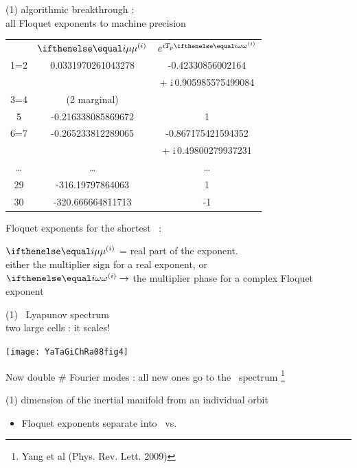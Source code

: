 \begin{frame}{(1) algorithmic breakthrough : \\
            all Floquet exponents to machine precision}
\begin{center}
\small
\begin{tabular}{  c | c | c| } %

	&  \large{$\eigRe[i]$ }  &\large{$e^{iT_{p}\eigIm[i]}$}   \\
  1=2  & 0.0331970261043278   & -0.42330856002164    \\
	& 			  & + i\,0.905985575499084 \\
  3=4  & (2 marginal) &                          \\
	5  & -0.216338085869672   & 1                         \\
  6=7  & -0.265233812289065   & -0.867175421594352   \\
	& 			  & + i\,0.49800279937231   \\
	\dots & \dots  & \dots                   \\
	29 & -316.19797864063     & 1                         \\
	30 & -320.666664811713    & -1                        \\
	\end{tabular}
	\end{center}
\bigskip

Floquet exponents for the shortest \ppo\ :

\bigskip

$\eigRe[i]$ = real part of the exponent.
\\
either
the multiplier sign for a real exponent, or
\\
$\eigIm[i] \to $
the multiplier phase for a complex Floquet exponent
\end{frame}

\begin{frame}{(1) \KS\ Lyapunov spectrum \\ two large cells : it scales!}
\begin{center}
\texttt{[image: YaTaGiChRa08fig4]}
\end{center}

Now double \# Fourier modes : all new ones go to the \transient\ spectrum
\footnote{\footnotesize
Yang et al (Phys. Rev. Lett. 2009)}
\end{frame}

\begin{frame}{(1) dimension of the inertial manifold from an individual orbit}

\bigskip

\begin{itemize}
  \item Floquet exponents separate into \entangled\ vs. \transient
\end{itemize}
\end{frame}


